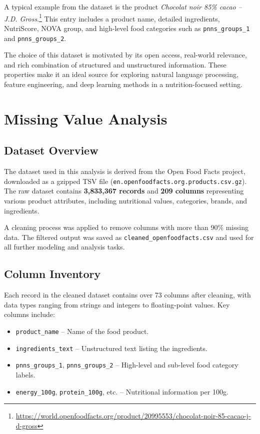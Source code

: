 \documentclass[11pt]{article}
\begin{document}
A typical example from the dataset is the product \textit{Chocolat noir 85\% cacao – J.D. Gross}.\footnote{\url{https://world.openfoodfacts.org/product/20995553/chocolat-noir-85-cacao-j-d-gross}} This entry includes a product name, detailed ingredients, NutriScore, NOVA group, and high-level food categories such as \texttt{pnns\_groups\_1} and \texttt{pnns\_groups\_2}.

The choice of this dataset is motivated by its open access, real-world relevance, and rich combination of structured and unstructured information. These properties make it an ideal source for exploring natural language processing, feature engineering, and deep learning methods in a nutrition-focused setting.



\section{Missing Value Analysis}

\subsection{Dataset Overview}

The dataset used in this analysis is derived from the Open Food Facts project, downloaded as a gzipped TSV file (\texttt{en.openfoodfacts.org.products.csv.gz}). The raw dataset contains \textbf{3,833,367 records} and \textbf{209 columns} representing various product attributes, including nutritional values, categories, brands, and ingredients.

A cleaning process was applied to remove columns with more than 90\% missing data. The filtered output was saved as \texttt{cleaned\_openfoodfacts.csv} and used for all further modeling and analysis tasks.

\subsection{Column Inventory}

Each record in the cleaned dataset contains over 73 columns after cleaning, with data types ranging from strings and integers to floating-point values. Key columns include:

\begin{itemize}
    \item \texttt{product\_name} -- Name of the food product.
    \item \texttt{ingredients\_text} -- Unstructured text listing the ingredients.
    \item \texttt{pnns\_groups\_1}, \texttt{pnns\_groups\_2} -- High-level and sub-level food category labels.
    \item \texttt{energy\_100g}, \texttt{protein\_100g}, etc. -- Nutritional information per 100g.
\end{itemize}
\end{document}
